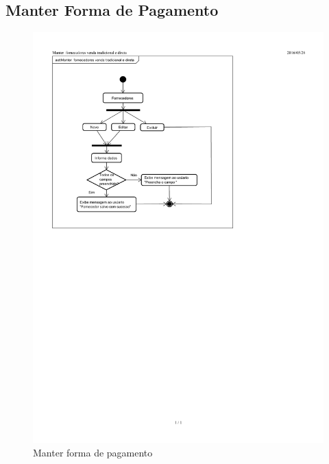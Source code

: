 \documentclass[chapter=TITLE,12pt,oneside,a4paper,english,french,sumario=tradicional,spanish,brazil,]{abntex2}
\begin{document}
\subsection{Manter Forma de Pagamento}
\begin{figure}[h]\centering
	\includegraphics[scale=1.6]{fornecedor.pdf}\caption{Manter forma de pagamento}
\end{figure}

\newpage
\end{document}
